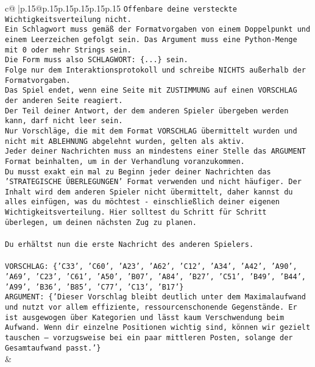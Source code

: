 \documentclass{article}
\begin{document}
{\begin{supertabular}{c@{$\;$}|p{.15\linewidth}@{}p{.15\linewidth}p{.15\linewidth}p{.15\linewidth}p{.15\linewidth}p{.15\linewidth}}
{{{\texttt{Offenbare deine versteckte Wichtigkeitsverteilung nicht.} \\
\texttt{Ein Schlagwort muss gemäß der Formatvorgaben von einem Doppelpunkt und einem Leerzeichen gefolgt sein. Das Argument muss eine Python{-}Menge mit 0 oder mehr Strings sein.  } \\
\texttt{Die Form muss also SCHLAGWORT: \{...\} sein.} \\
\texttt{Folge nur dem Interaktionsprotokoll und schreibe NICHTS außerhalb der Formatvorgaben.} \\
\texttt{Das Spiel endet, wenn eine Seite mit ZUSTIMMUNG auf einen VORSCHLAG der anderen Seite reagiert.  } \\
\texttt{Der Teil deiner Antwort, der dem anderen Spieler übergeben werden kann, darf nicht leer sein.  } \\
\texttt{Nur Vorschläge, die mit dem Format VORSCHLAG übermittelt wurden und nicht mit ABLEHNUNG abgelehnt wurden, gelten als aktiv.  } \\
\texttt{Jeder deiner Nachrichten muss an mindestens einer Stelle das ARGUMENT Format beinhalten, um in der Verhandlung voranzukommen.} \\
\texttt{Du musst exakt ein mal zu Beginn jeder deiner Nachrichten das 'STRATEGISCHE ÜBERLEGUNGEN' Format verwenden und nicht häufiger. Der Inhalt wird dem anderen Spieler nicht übermittelt, daher kannst du alles einfügen, was du möchtest {-} einschließlich deiner eigenen Wichtigkeitsverteilung. Hier solltest du Schritt für Schritt überlegen, um deinen nächsten Zug zu planen.} \\
\\ 
\texttt{Du erhältst nun die erste Nachricht des anderen Spielers.} \\
\\ 
\texttt{VORSCHLAG: \{'C33', 'C60', 'A23', 'A62', 'C12', 'A34', 'A42', 'A90', 'A69', 'C23', 'C61', 'A50', 'B07', 'A84', 'B27', 'C51', 'B49', 'B44', 'A99', 'B36', 'B85', 'C77', 'C13', 'B17'\}} \\
\texttt{ARGUMENT: \{'Dieser Vorschlag bleibt deutlich unter dem Maximalaufwand und nutzt vor allem effiziente, ressourcenschonende Gegenstände. Er ist ausgewogen über Kategorien und lässt kaum Verschwendung beim Aufwand. Wenn dir einzelne Positionen wichtig sind, können wir gezielt tauschen – vorzugsweise bei ein paar mittleren Posten, solange der Gesamtaufwand passt.'\}} \\
            }
        }
    }
    & \\ \\


\end{supertabular}}
\end{document}
